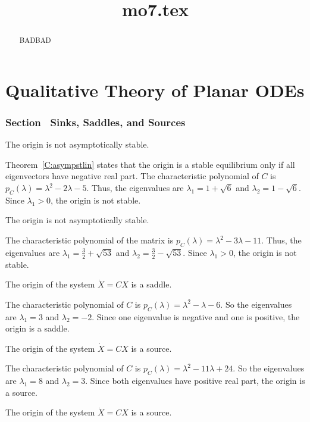 \documentclass{ximera}
\title{mo7.tex}
\begin{document}
\begin{abstract}
BADBAD
\end{abstract}
\maketitle

\chapter{Qualitative Theory of Planar ODEs}

\subsection*{Section~\protect{\ref{S:6.7}} Sinks, Saddles, and Sources}

 \ans The origin is not asymptotically stable.

\soln Theorem~\ref{C:asympstlin} states that the origin is a stable
equilibrium only if all eigenvectors have negative real part.  The
characteristic polynomial of $C$ is $p_C(\lambda) = \lambda^2 - 2\lambda
- 5$.  Thus, the eigenvalues are $\lambda_1 = 1 + \sqrt{6}$ and
$\lambda_2 = 1 - \sqrt{6}$. Since $\lambda_1 > 0$, the origin
is not stable.

 \ans The origin is not asymptotically stable.

\soln The characteristic polynomial of the matrix is $p_C(\lambda) =
\lambda^2 - 3\lambda - 11$.  Thus, the eigenvalues are $\lambda_1 =
\frac{3}{2} + \sqrt{53}$ and $\lambda_2 = \frac{3}{2} - \sqrt{53}$.
Since $\lambda_1 > 0$, the origin is not stable.

 \ans The origin of the system $\dot{X} = CX$ is a saddle.

\soln The characteristic polynomial of $C$ is
$p_C(\lambda) = \lambda^2 - \lambda - 6$.  So the eigenvalues are
$\lambda_1 = 3$ and $\lambda_2 = -2$.  Since one eigenvalue is negative
and one is positive, the origin is a saddle.

 \ans The origin of the system $\dot{X} = CX$ is a source.

\soln The characteristic polynomial of $C$ is
$p_C(\lambda) = \lambda^2 - 11\lambda + 24$.  So the eigenvalues are
$\lambda_1 = 8$ and $\lambda_2 = 3$.  Since both eigenvalues have
positive real part, the origin is a source.

 \ans The origin of the system $\dot{X} = CX$ is a source.
\end{document}
